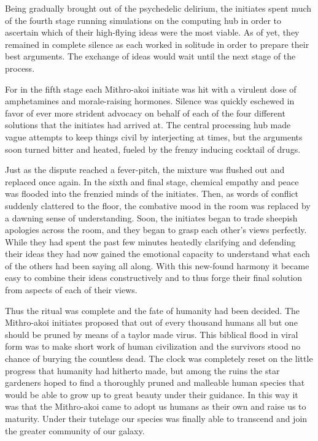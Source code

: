 \documentclass[12pt]{article}
\begin{document}
Being gradually brought out of the psychedelic delirium,
the initiates spent much of the fourth stage running simulations on the computing hub in order to ascertain which of their high-flying ideas were the most viable.
As of yet, they remained in complete silence as each worked in solitude in order to prepare their best arguments.
The exchange of ideas would wait until the next stage of the process.

For in the fifth stage each Mithro-akoi initiate was hit with a virulent dose of amphetamines and morale-raising hormones.
Silence was quickly eschewed in favor of ever more strident advocacy on behalf of each of the four different solutions that the initiates had arrived at.
The central processing hub made vague attempts to keep things civil by interjecting at times,
but the arguments soon turned bitter and heated,
fueled by the frenzy inducing cocktail of drugs.

Just as the dispute reached a fever-pitch,
the mixture was flushed out and replaced once again.
In the sixth and final stage, 
chemical empathy and peace was flooded into the frenzied minds of the initiates.
Then, as words of conflict suddenly clattered to the floor, the combative mood in the room was replaced by a dawning sense of understanding.
Soon, the initiates began to trade sheepish apologies across the room, 
and they began to grasp each other's views perfectly.
While they had spent the past few minutes heatedly clarifying and defending their ideas they had now gained the emotional capacity to understand what each of the others had been saying all along. 
With this new-found harmony it became easy to combine their ideas constructively and to thus forge their final solution from aspects of each of their views.

Thus the ritual was complete and the fate of humanity had been decided.
The Mithro-akoi initiates proposed that out of every thousand humans all but one should be pruned by means of a taylor made virus.
This biblical flood in viral form was to make short work of human civilization 
and the survivors stood no chance of burying the countless dead. 
The clock was completely reset on the little progress that humanity had hitherto made,
but among the ruins the star gardeners hoped to find a thoroughly pruned and malleable human species that would be able to grow up to great beauty under their guidance.
In this way it was that the Mithro-akoi came to adopt us humans as their own and raise us to maturity.
Under their tutelage our species was finally able to transcend and join the greater community of our galaxy.
\end{document}
